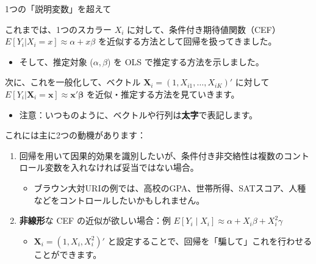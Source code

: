 \documentclass[11pt,handout]{beamer}
\newenvironment{wideitemize}{\itemize\addtolength{\itemsep}{10pt}}{\enditemize}
\begin{document}
	\begin{frame}{1つの「説明変数」を超えて}
		\begin{wideitemize}
			
			\item
			これまでは、1つのスカラー $X_i$ に対して、条件付き期待値関数（CEF） $E[Y_i|X_i =x ] \approx \alpha + x \beta$ を近似する方法として回帰を扱ってきました。
			\begin{itemize}
					\item 
					そして、推定対象 ($\alpha, \beta$) を OLS で推定する方法を示しました。
				\end{itemize}
			
			\pause
			\item
			次に、これを一般化して、ベクトル $\mathbf{X}_i = (1, X_{i1}, \dots, X_{iK})'$ に対して $E[Y_i | \mathbf{X}_i = \mathbf{x}] \approx \mathbf{x}' \bm{\beta}$ を近似・推定する方法を見ていきます。
				\begin{itemize}\smallskip
					\item 
					注意：いつものように、ベクトルや行列は\textbf{太字}で表記します。
				\end{itemize}
			
			\pause
			\item
			これには主に2つの動機があります： \medskip
			\end{wideitemize}	

			\pause
\begin{enumerate}
			\item
			回帰を用いて因果的効果を識別したいが、条件付き非交絡性は複数のコントロール変数を入れなければ妥当ではない場合。 \smallskip
			\begin{itemize}
				\item 
				ブラウン大対URIの例では、高校のGPA、世帯所得、SATスコア、人種などをコントロールしたいかもしれません。
			\end{itemize}
			\medskip
			
			\pause
			\item
			\textbf{非線形}な CEF の近似が欲しい場合：例 $E[Y_i\mid X_i]\approx\alpha+X_i\beta+X_i^2\gamma$ \smallskip
			\begin{itemize}
			\item $\mathbf{X}_i = (1, X_{i}, X_{i}^2)'$ と設定することで、回帰を「騙して」これを行わせることができます。
			\end{itemize}
			\end{enumerate}
			
		
		
	\end{frame}
	
\end{document}
